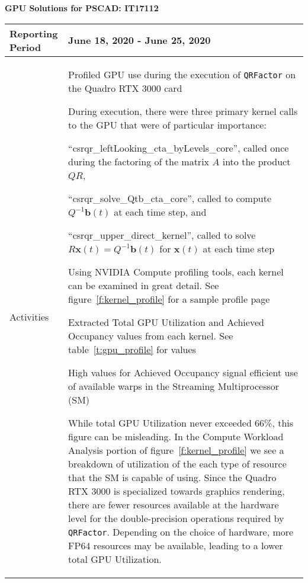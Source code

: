 \documentclass[11pt,letterpaper]{article}
\newcommand{\its}{\item[\tiny\textbullet]}
\begin{document}
\vspace{.2in}
\begin{center}
    {\bf GPU Solutions for PSCAD: IT17112}
\end{center}

\vspace{.25in}

\begin{tabular}{| p{} | p{} |}
	\hline
	Reporting Period & June 18, 2020 - June 25, 2020 \\ \hline

	Activities & \begin{enumerate*}
    \item[\tiny\textbullet]  Profiled GPU use during the execution of \texttt{QRFactor} on the Quadro RTX 3000 card \newline
    \its During execution, there were three primary kernel calls to the GPU that were of particular importance: 
        \begin{enumerate*} 
            \item  ``csrqr\_leftLooking\_cta\_byLevels\_core'', called once during the 
            factoring of the matrix $A$ into the product $QR$, 
            \item ``csrqr\_solve\_Qtb\_cta\_core'', called to compute $Q^{-1} \mathbf{b}(t)$
    at each time step, and
            \item ``csrqr\_upper\_direct\_kernel'', called to solve $R\mathbf{x}(t) = Q^{-1} \mathbf{b}(t)$ for $\mathbf{x}(t)$ at each time step
        \end{enumerate*} \newline
    \its Using NVIDIA Compute profiling tools, each kernel can be examined in great detail. See figure~\ref{f:kernel_profile} for
    a sample profile page \newline
    \its Extracted Total GPU Utilization and Achieved Occupancy values from each kernel. See table~\ref{t:gpu_profile} for values \newline
    \its High values for Achieved Occupancy signal efficient use of available warps in the Streaming Multiprocessor (SM) \newline
    \its While total GPU Utilization never exceeded 66\%, this figure can be misleading. In the Compute Workload Analysis portion 
    of figure~\ref{f:kernel_profile} we see a breakdown of utilization of the each type of resource that the SM is capable 
    of using. Since the Quadro RTX 3000 is specialized towards graphics rendering, there are fewer resources available 
    at the hardware level for the double-precision operations required by \texttt{QRFactor}. Depending on the choice of hardware, more FP64 resources may
    be available, leading to a lower total GPU Utilization.
    \end{enumerate*} \\ \hline


\end{tabular}
\end{document}
